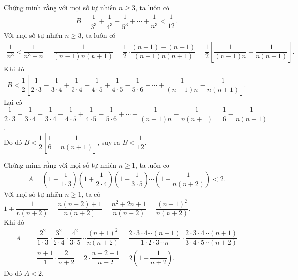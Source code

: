 \begin{bt}%
 Chứng minh rằng với mọi số tự nhiên $n \geq 3$, ta luôn có
 \begin{eqnarray*}
  B = \dfrac{1}{3^3} + \dfrac{1}{4^3} + \dfrac{1}{5^3} + \cdots + \dfrac{1}{n^3} < \dfrac{1}{12}.
 \end{eqnarray*}
 \loigiai
  {
  Với mọi số tự nhiên $n \geq 3$, ta luôn có
  \begin{eqnarray*}
   \dfrac{1}{n^3} < \dfrac{1}{n^3-n} = \dfrac{1}{(n-1)n(n+1)} = \dfrac{1}{2} \cdot \dfrac{(n+1)-(n-1)}{(n-1)n(n+1)} = \dfrac{1}{2} \left[\dfrac{1}{(n-1)n}-\dfrac{1}{n(n+1)}\right].
  \end{eqnarray*}
  Khi đó
  \begin{eqnarray*}
   B < \dfrac{1}{2} \left[\dfrac{1}{2 \cdot 3} - \dfrac{1}{3 \cdot 4} + \dfrac{1}{3 \cdot 4} - \dfrac{1}{4 \cdot 5} + \dfrac{1}{4 \cdot 5} - \dfrac{1}{5 \cdot 6} + \cdots + \dfrac{1}{(n-1)n}-\dfrac{1}{n(n+1)}\right].
  \end{eqnarray*}
  Lại có $\dfrac{1}{2 \cdot 3} - \dfrac{1}{3 \cdot 4} + \dfrac{1}{3 \cdot 4} - \dfrac{1}{4 \cdot 5} + \dfrac{1}{4 \cdot 5} - \dfrac{1}{5 \cdot 6} + \cdots + \dfrac{1}{(n-1)n}-\dfrac{1}{n(n+1)} = \dfrac{1}{6} - \dfrac{1}{n(n+1)}$.\\
  Do đó $B < \dfrac{1}{2} \left[\dfrac{1}{6}-\dfrac{1}{n(n+1)}\right]$, suy ra $B < \dfrac{1}{12}$.
  }
\end{bt}

\begin{bt}%
 Chứng minh rằng với mọi số tự nhiên $n \geq 1$, ta luôn có
 \begin{eqnarray*}
  A = \left(1+\dfrac{1}{1 \cdot 3}\right) \left(1+\dfrac{1}{2 \cdot 4}\right) \left(1+\dfrac{1}{3 \cdot 5}\right) \cdots \left(1+\dfrac{1}{n(n+2)}\right) <2.
 \end{eqnarray*}
 \loigiai
  {
  Với mọi số tự nhiên $n \geq 1$, ta có $1+\dfrac{1}{n(n+2)} = \dfrac{n(n+2)+1}{n(n+2)} = \dfrac{n^2+2n+1}{n(n+2)} = \dfrac{(n+1)^2}{n(n+2)}$.\\
  Khi đó
  \allowdisplaybreaks
  \begin{eqnarray*}
   A &=& \dfrac{2^2}{1 \cdot 3} \cdot \dfrac{3^2}{2 \cdot 4} \cdot \dfrac{4^2}{3 \cdot 5} \cdots \dfrac{(n+1)^2}{n(n+2)} = \dfrac{2 \cdot 3 \cdot 4 \cdots (n+1)}{1 \cdot 2 \cdot 3 \cdots n} \cdot \dfrac{2 \cdot 3 \cdot 4 \cdots (n+1)}{3 \cdot 4 \cdot 5 \cdots (n+2)}\\
   &=& \dfrac{n+1}{1} \cdot \dfrac{2}{n+2} = 2 \cdot \dfrac{n+2-1}{n+2} = 2\left(1-\dfrac{1}{n+2}\right).
  \end{eqnarray*}
  Do đó $A < 2$.
  }
\end{bt}

